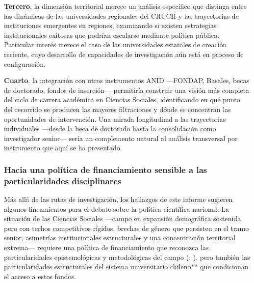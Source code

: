 \documentclass[
  12pt,
  letterpaper,
]{article}
\begin{document}
\textbf{Tercero}, la dimensión territorial merece un análisis específico
que distinga entre las dinámicas de las universidades regionales del
CRUCH y las trayectorias de instituciones emergentes en regiones,
examinando si existen estrategias institucionales exitosas que podrían
escalarse mediante política pública. Particular interés merece el caso
de las universidades estatales de creación reciente, cuyo desarrollo de
capacidades de investigación aún está en proceso de configuración.

\textbf{Cuarto}, la integración con otros instrumentos ANID ---FONDAP,
Basales, becas de doctorado, fondos de inserción--- permitiría construir
una visión más completa del ciclo de carrera académica en Ciencias
Sociales, identificando en qué punto del recorrido se producen las
mayores filtraciones y dónde se concentran las oportunidades de
intervención. Una mirada longitudinal a las trayectorias individuales
---desde la beca de doctorado hasta la consolidación como investigador
senior--- sería un complemento natural al análisis transversal por
instrumento que aquí se ha presentado.

\subsubsection{Hacia una política de financiamiento sensible a las
particularidades
disciplinares}\label{hacia-una-poluxedtica-de-financiamiento-sensible-a-las-particularidades-disciplinares}

Más allá de las rutas de investigación, los hallazgos de este informe
sugieren algunos lineamientos para el debate sobre la política
científica nacional. La situación de las Ciencias Sociales ---campo en
expansión demográfica sostenida pero con techos competitivos rígidos,
brechas de género que persisten en el tramo senior, asimetrías
institucionales estructurales y una concentración territorial extrema---
requiere una política de financiamiento que reconozca las
particularidades epistemológicas y metodológicas del campo
(;
),
pero también las particularidades estructurales del sistema
universitario chileno** que condicionan el acceso a estos fondos.
\end{document}
